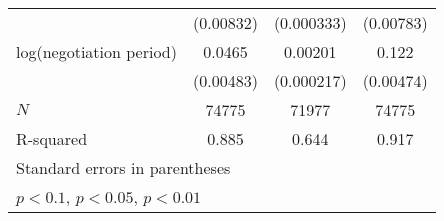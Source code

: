 {\begin{tabular}{l*{3}{c}}
            &   (0.00832)         &  (0.000333)         &   (0.00783)         \\
\addlinespace
log(negotiation period)&      0.0465\sym{***}&     0.00201\sym{***}&       0.122\sym{***}\\
            &   (0.00483)         &  (0.000217)         &   (0.00474)         \\
\midrule
\(N\)       &       74775         &       71977         &       74775         \\
R-squared   &       0.885         &       0.644         &       0.917         \\
\bottomrule
\multicolumn{4}{l}{\footnotesize Standard errors in parentheses}\\
\multicolumn{4}{l}{\footnotesize \sym{*} \(p<0.1\), \sym{**} \(p<0.05\), \sym{***} \(p<0.01\)}\\
\end{tabular}
}
